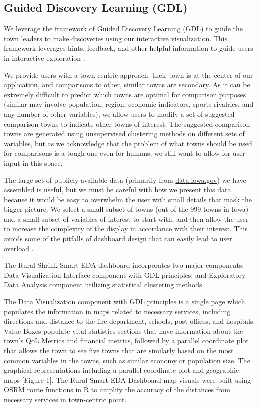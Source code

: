 \documentclass[letterpaper,inpress]{jdsart}
\begin{document}
\subsection{Guided Discovery Learning (GDL)}

We leverage the framework of Guided Discovery Learning (GDL) to guide the town leaders to make discoveries using our interactive visualization. This framework leverages hints, feedback, and other helpful information to guide users in interactive exploration \cite{dedonno}.

We provide users with a town-centric approach: their town is at the center of our application, and comparisons to other, similar towns are secondary. As it can be extremely difficult to predict which towns are optimal for comparison purposes (similar may involve population, region, economic indicators, sports rivalries, and any number of other variables), we allow users to modify a set of suggested comparison towns to indicate other towns of interest. The suggested comparison towns are generated using unsupervised clustering methods on different sets of variables, but as we acknowledge that the problem of what towns should be used for comparisons is a tough one even for humans, we still want to allow for user input in this space.

The large set of publicly available data (primarily from \url{data.iowa.gov}) we have assembled is useful, but we must be careful with how we present this data because it would be easy to overwhelm the user with small details that mask the bigger picture. We select a small subset of towns (out of the 999 towns in Iowa) and a small subset of variables of interest to start with, and then allow the user to increase the complexity of the display in accordance with their interest. This avoids some of the pitfalls of dashboard design that can easily lead to user overload \cite{few}.

The Rural Shrink Smart EDA dashboard incorporates two major components: Data Visualization Interface component with GDL principles; and Exploratory Data Analysis component utilizing statistical clustering methods.

The Data Visualization component with GDL principles is a single page which populates the information in maps related to necessary services, including directions and distance to the fire department, schools, post offices, and hospitals. Value Boxes populate vital statistics sections that have information about the town's QoL Metrics and financial metrics, followed by a parallel coordinate plot that allows the town to see five towns that are similarly based on the most common variables in the towns, such as similar economy or population size. The graphical representations including a parallel coordinate plot and geographic maps {[}Figure 1{]}. The Rural Smart EDA Dashboard map visuals were built using OSRM route functions in R to amplify the accuracy of the distances from necessary services in town-centric point.
\end{document}
